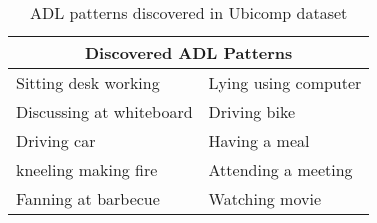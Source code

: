 \documentclass{sigchi}
\begin{document}
\begin{table}[htbp]
    \begin{tabular}{rr}
    \toprule
    \multicolumn{2}{c}{\textbf{Discovered ADL Patterns}} \\
    \midrule
    \multicolumn{1}{l}{Sitting desk working} & \multicolumn{1}{l}{Lying using computer} \\
    \multicolumn{1}{l}{Discussing at whiteboard} & \multicolumn{1}{l}{Driving bike} \\
    \multicolumn{1}{l}{Driving car} & \multicolumn{1}{l}{Having a meal} \\
    \multicolumn{1}{l}{kneeling making fire} & \multicolumn{1}{l}{Attending a meeting} \\
    \multicolumn{1}{l}{Fanning at barbecue} & \multicolumn{1}{l}{Watching movie} \\
    \bottomrule
    \end{tabular}%
    \caption{ADL patterns discovered in Ubicomp dataset}
  \label{tab: ADL patterns discovered}%
\end{table}%
\end{document}
